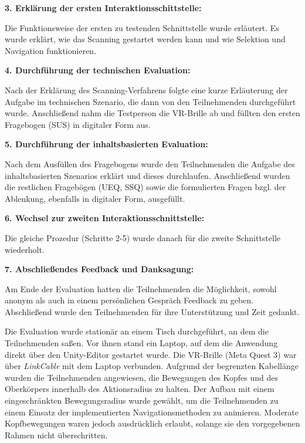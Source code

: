 {\normalfont \bfseries 3. Erklärung der ersten Interaktionsschittstelle:}

Die Funktionsweise der ersten zu testenden Schnittstelle wurde erläutert. Es wurde erklärt, wie das Scanning gestartet werden kann und wie Selektion und Navigation funktionieren. 

{\normalfont \bfseries 4. Durchführung der technischen Evaluation:}

Nach der Erklärung des Scanning-Verfahrens folgte eine kurze Erläuterung der Aufgabe im technischen Szenario, die dann von den Teilnehmenden durchgeführt wurde. Anschließend nahm die Testperson die VR-Brille ab und füllten den ersten Fragebogen (SUS) in digitaler Form aus. 

{\normalfont \bfseries 5. Durchführung der inhaltsbasierten Evaluation:}

Nach dem Ausfüllen des Fragebogens wurde den Teilnehmenden die Aufgabe des inhaltsbasierten Szenarios erklärt und dieses durchlaufen. Anschließend wurden die restlichen Fragebögen (UEQ, SSQ) sowie die formulierten Fragen bzgl. der Ablenkung, ebenfalls in digitaler Form, ausgefüllt.

{\normalfont \bfseries 6. Wechsel zur zweiten Interaktionsschnittstelle:}

Die gleiche Prozedur (Schritte 2-5) wurde danach für die zweite Schnittstelle wiederholt.

{\normalfont \bfseries 7. Abschließendes Feedback und Danksagung:}

Am Ende der Evaluation hatten die Teilnehmenden die Möglichkeit, sowohl anonym als auch in einem persönlichen Gespräch Feedback zu geben. Abschließend wurde den Teilnehmenden für ihre Unterstützung und Zeit gedankt. 

Die Evaluation wurde stationär an einem Tisch durchgeführt, an dem die Teilnehmenden saßen. Vor ihnen stand ein Laptop, auf dem die Anwendung direkt über den Unity-Editor gestartet wurde. Die VR-Brille (Meta Quest 3) war über \textit{LinkCable} mit dem Laptop verbunden. Aufgrund der begrenzten Kabellänge wurden die Teilnehmenden angewiesen, die Bewegungen des Kopfes und des Oberkörpers innerhalb des Aktionsradius zu halten. Der Aufbau mit einem eingeschränkten Bewegungsradius wurde gewählt, um die Teilnehmenden zu einem Einsatz der implementierten Navigationsmethoden zu animieren. Moderate Kopfbewegungen waren jedoch ausdrücklich erlaubt, solange sie den vorgegebenen Rahmen nicht überschritten.

